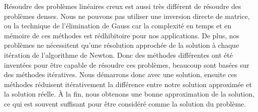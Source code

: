 Résoudre des problèmes linéaires creux est aussi très différent de résoudre des problèmes denses.
%
Nous ne pouvons pas utiliser une inversion directe de matrice, ou la technique de l'élimination de Gauss car la complexité en temps et en mémoire de ces méthodes est rédhibitoire pour nos applications.
%
De plus, nos problèmes ne nécessitent qu'une résolution approchée de la solution à chaque itération de l'algorithme de Newton.
%
Donc des méthodes différentes ont été inventées pour être capable de résoudre ces problèmes, beaucoup sont basées sur des méthodes itératives.
%
Nous démarrons donc avec une solution, ensuite ces méthodes réduisent itérativement la différence entre notre solution approximée et la solution réelle.
%
\`{A} la fin, nous obtenons une bonne approximation de la solution, ce qui est souvent suffisant pour être considéré comme la solution du problème.

